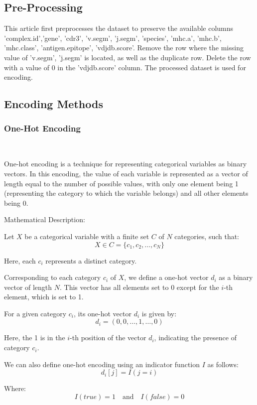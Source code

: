 \documentclass[conference]{IEEEtran}
\begin{document}
	
	\subsection{Pre-Processing}
	This article first preprocesses the dataset to preserve the available columns 'complex.id','gene', 'cdr3', 'v.segm', 'j.segm', 'species', 'mhc.a', 'mhc.b', 'mhc.class', 'antigen.epitope', 'vdjdb.score'. Remove the row where the missing value of 'v.segm', 'j.segm' is located, as well as the duplicate row. Delete the row with a value of 0 in the 'vdjdb.score' column. The processed dataset is used for encoding.
	
	\subsection{Encoding Methods}
	\subsubsection{One-Hot Encoding} \
	
	One-hot encoding\cite{b2} is a technique for representing categorical variables as binary vectors. In this encoding, the value of each variable is represented as a vector of length equal to the number of possible values, with only one element being 1 (representing the category to which the variable belongs) and all other elements being 0.
	
	Mathematical Description:
	
	Let \( X \) be a categorical variable with a finite set \( C \) of \( N \) categories, such that:
	\[ X \in C = \{ c_1, c_2, \ldots, c_N \} \]
	
	Here, each \( c_i \) represents a distinct category.
	
	Corresponding to each category \( c_i \) of \( X \), we define a one-hot vector \( d_i \) as a binary vector of length \( N \). This vector has all elements set to 0 except for the \( i \)-th element, which is set to 1.

	For a given category \( c_i \), its one-hot vector \( d_i \) is given by:
	\[ d_i = (0, 0, \ldots, 1, \ldots, 0) \]
	
	Here, the 1 is in the \( i \)-th position of the vector \( d_i \), indicating the presence of category \( c_i \).
	
	We can also define one-hot encoding using an indicator function \( I \) as follows:
	\[ d_{i}[j] = I(j = i) \]
	
	Where:
	\[ I(true) = 1 \quad \text{and} \quad I(false) = 0 \]
	
\end{document}
